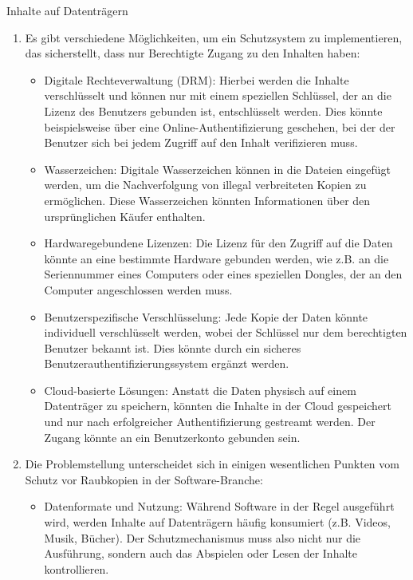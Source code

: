 \documentclass{article}
\begin{document}
\begin{exercise}[1]{Inhalte auf Datenträgern}
  \begin{solution}
    \begin{enumerate}
      \item Es gibt verschiedene Möglichkeiten, um ein Schutzsystem zu implementieren, das sicherstellt, dass nur Berechtigte Zugang zu den Inhalten haben:
            \begin{itemize}
              \item Digitale Rechteverwaltung (DRM): Hierbei werden die Inhalte verschlüsselt und können nur mit einem speziellen Schlüssel, der an die Lizenz des Benutzers gebunden ist, entschlüsselt werden. Dies könnte beispielsweise über eine Online-Authentifizierung geschehen, bei der der Benutzer sich bei jedem Zugriff auf den Inhalt verifizieren muss.
              \item Wasserzeichen: Digitale Wasserzeichen können in die Dateien eingefügt werden, um die Nachverfolgung von illegal verbreiteten Kopien zu ermöglichen. Diese Wasserzeichen könnten Informationen über den ursprünglichen Käufer enthalten.
              \item Hardwaregebundene Lizenzen: Die Lizenz für den Zugriff auf die Daten könnte an eine bestimmte Hardware gebunden werden, wie z.B. an die Seriennummer eines Computers oder eines speziellen Dongles, der an den Computer angeschlossen werden muss.
              \item Benutzerspezifische Verschlüsselung: Jede Kopie der Daten könnte individuell verschlüsselt werden, wobei der Schlüssel nur dem berechtigten Benutzer bekannt ist. Dies könnte durch ein sicheres Benutzerauthentifizierungssystem ergänzt werden.
              \item Cloud-basierte Lösungen: Anstatt die Daten physisch auf einem Datenträger zu speichern, könnten die Inhalte in der Cloud gespeichert und nur nach erfolgreicher Authentifizierung gestreamt werden. Der Zugang könnte an ein Benutzerkonto gebunden sein.
            \end{itemize}
      \item Die Problemstellung unterscheidet sich in einigen wesentlichen Punkten vom Schutz vor Raubkopien in der Software-Branche:
            \begin{itemize}
              \item Datenformate und Nutzung: Während Software in der Regel ausgeführt wird, werden Inhalte auf Datenträgern häufig konsumiert (z.B. Videos, Musik, Bücher). Der Schutzmechanismus muss also nicht nur die Ausführung, sondern auch das Abspielen oder Lesen der Inhalte kontrollieren.

\end{itemize}
\end{enumerate}
\end{solution}
\end{exercise}
\end{document}
